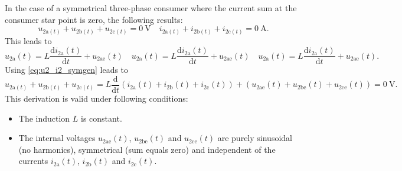 \begin{solutionblock}
    In the case of a symmetrical three-phase consumer where the current sum at the consumer star point is zero, 
    the following results:
    \begin{equation}
        u_{\mathrm{2a}(t)} + u_{\mathrm{2b}(t)} + u_{\mathrm{2c}(t)} = \SI{0}{\volt} \quad 
        i_{\mathrm{2a}(t)} + i_{\mathrm{2b}(t)} + i_{\mathrm{2c}(t)} = \SI{0}{\ampere}.
        \label{eq:u2_i2_symgen}        
    \end{equation}
    This leads to
    \begin{equation}
        u_{\mathrm{2a}}(t) = L \frac{\mathrm{d}i_{\mathrm{2a}}(t)}{\mathrm{d}t}+u_{\mathrm{2ae}}(t)
        \quad u_{\mathrm{2a}}(t) = L \frac{\mathrm{d}i_{\mathrm{2a}}(t)}{\mathrm{d}t}+u_{\mathrm{2ae}}(t)
        \quad u_{\mathrm{2a}}(t) = L \frac{\mathrm{d}i_{\mathrm{2a}}(t)}{\mathrm{d}t}+u_{\mathrm{2ae}}(t).
        \label{eq:u2_i2_symL}         
    \end{equation}
    Using \eqref{eq:u2_i2_symgen} leads to
    \begin{equation}
        u_{\mathrm{2a}(t)} + u_{\mathrm{2b}(t)} + u_{\mathrm{2c}(t)} 
        = L \frac{\mathrm{d}}{\mathrm{d}t} \left( i_{\mathrm{2a}}(t)+i_{\mathrm{2b}}(t)+i_{\mathrm{2c}}(t) \right) 
         + \left( u_{\mathrm{2ae}}(t) + u_{\mathrm{2be}}(t) + u_{\mathrm{2ce}}(t)\right)=\SI{0}{\volt}.
        \label{eq:u2_i2_symres} 
    \end{equation}
    This derivation is valid under following conditions:
    \begin{itemize}
        \item The induction $L$ is constant.
        \item The internal voltages $u_{\mathrm{2ae}}(t)$, $u_{\mathrm{2be}}(t)$ and $u_{\mathrm{2ce}}(t)$ 
        are purely sinusoidal (no harmonics), symmetrical (sum equals zero) and independent of the currents
        $i_{\mathrm{2a}}(t)$, $i_{\mathrm{2b}}(t)$ and $i_{\mathrm{2c}}(t)$.
    \end{itemize}     
\end{solutionblock}

